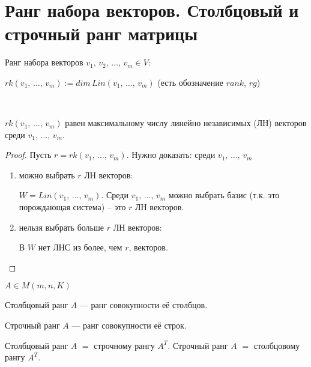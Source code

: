 \section{Ранг набора векторов. Столбцовый и строчный ранг матрицы}

\begin{conj} 

    Ранг набора векторов $v_1,\, v_2,\, \dots,\, v_m \in V$: 
    
    $rk(v_1,\, \dots,\, v_m) := dim\, Lin(v_1,\, \dots,\, v_m)$ (есть обозначение $rank$, $rg$)

\end{conj}
\
\begin{theorem-non} 
    
    $rk(v_1,\, \dots,\, v_m)$ равен максимальному числу линейно независимых (ЛН) векторов среди $v_1,\, \dots,\, v_m$.
    \begin{proof}
        
        Пусть $r = rk(v_1,\, \dots,\, v_m)$. Нужно доказать: среди $v_1,\, \dots,\, v_m$

        \begin{enumerate}
            \item можно выбрать $r$ ЛН векторов:
            
            $W = Lin(v_1,\, \dots,\, v_m)$. 
            Среди $v_1,\, \dots,\, v_m$ можно выбрать базис (т.к. это порождающая система) -- это $r$ ЛН векторов.
            \item нельзя выбрать больше $r$ ЛН векторов:
            
            В $W$ нет ЛНС из более, чем $r$, векторов.
        \end{enumerate}
        
    \end{proof}
\end{theorem-non}

\begin{conj} 

    $A \in M(m, n, K)$

    Столбцовый ранг $A$ --- ранг совокупности её столбцов.

    Строчный ранг $A$ --- ранг совокупности её строк.

\end{conj}

\notice Столбцовый ранг $A$ $=$ строчному рангу $A^T$. Строчный ранг $A$ $=$ столбцовому рангу $A^T$.

